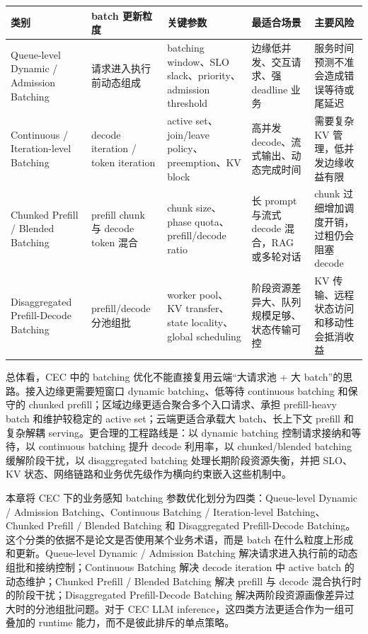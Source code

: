 \documentclass[a4paper,10pt]{ctexart}
\begin{document}
\begin{table}[H]
\centering
\scriptsize
\setlength{\tabcolsep}{3pt}
\renewcommand{\arraystretch}{1.15}
\begin{tabularx}{\textwidth}{|X|X|X|X|X|}
\hline
\textbf{类别} & \textbf{batch 更新粒度} & \textbf{关键参数} & \textbf{最适合场景} & \textbf{主要风险} \\ \hline
Queue-level Dynamic / Admission Batching & 请求进入执行前动态组成 & batching window、SLO slack、priority、admission threshold & 边缘低并发、交互请求、强 deadline 业务 & 服务时间预测不准会造成错误等待或尾延迟 \\ \hline
Continuous / Iteration-level Batching & decode iteration / token iteration & active set、join/leave policy、preemption、KV block & 高并发 decode、流式输出、动态完成时间 & 需要复杂 KV 管理，低并发边缘收益有限 \\ \hline
Chunked Prefill / Blended Batching & prefill chunk 与 decode token 混合 & chunk size、phase quota、prefill/decode ratio & 长 prompt 与流式 decode 混合，RAG 或多轮对话 & chunk 过细增加调度开销，过粗仍会阻塞 decode \\ \hline
Disaggregated Prefill-Decode Batching & prefill/decode 分池组批 & worker pool、KV transfer、state locality、global scheduling & 阶段资源差异大、队列规模足够、状态传输可控 & KV 传输、远程状态访问和移动性会抵消收益 \\ \hline
\end{tabularx}
\end{table}




总体看，CEC 中的 batching 优化不能直接复用云端“大请求池 + 大 batch”的思路。接入边缘更需要短窗口 dynamic batching、低等待 continuous batching 和保守的 chunked prefill；区域边缘更适合聚合多个入口请求、承担 prefill-heavy batch 和维护较稳定的 active set；云端更适合承载大 batch、长上下文 prefill 和复杂解耦 serving。更合理的工程路线是：以 dynamic batching 控制请求接纳和等待，以 continuous batching 提升 decode 利用率，以 chunked/blended batching 缓解阶段干扰，以 disaggregated batching 处理长期阶段资源失衡，并把 SLO、KV 状态、网络链路和业务优先级作为横向约束嵌入这些机制中。


本章将 CEC 下的业务感知 batching 参数优化划分为四类：Queue-level Dynamic / Admission Batching、Continuous Batching / Iteration-level Batching、Chunked Prefill / Blended Batching 和 Disaggregated Prefill-Decode Batching。这个分类的依据不是论文是否使用某个业务术语，而是 batch 在什么粒度上形成和更新。Queue-level Dynamic / Admission Batching 解决请求进入执行前的动态组批和接纳控制；Continuous Batching 解决 decode iteration 中 active batch 的动态维护；Chunked Prefill / Blended Batching 解决 prefill 与 decode 混合执行时的阶段干扰；Disaggregated Prefill-Decode Batching 解决两阶段资源画像差异过大时的分池组批问题。对于 CEC LLM inference，这四类方法更适合作为一组可叠加的 runtime 能力，而不是彼此排斥的单点策略。
\end{document}
